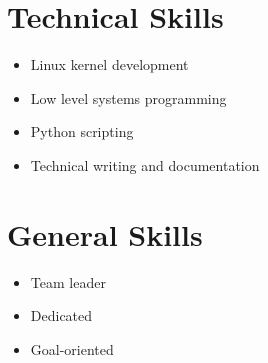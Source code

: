 \documentclass[
]{article}
\theoremstyle{plain}
\theoremstyle{remark}
\theoremstyle{definition}
\begin{document}
\begin{figure}
\begin{minipage}[t]{0.32\textwidth}
\section{Technical Skills}
\vspace{0.5em}
\begin{itemize}[itemsep=0em]
\item Linux kernel development
\item Low level systems programming
\item Python scripting
\item Technical writing and documentation
\end{itemize}

\section{General Skills}
\vspace{0.5em}
\begin{itemize}[itemsep=0em]
\item Team leader
\item Dedicated
\item Goal-oriented
\end{itemize}

\end{minipage}
\end{figure}

\printbibliography
\end{document}

